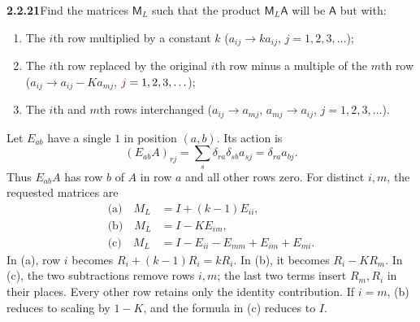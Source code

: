 \par\bigskip
\noindent\textbf{2.2.21}\quad Find the matrices $\mathsf{M}_{L}$ such that the
product $\mathsf{M}_{L}\mathsf{A}$ will be $\mathsf{A}$ but with:
\begin{enumerate}
\item[(a)] The $i$th row multiplied by a constant $k$ ($a_{ij}\to ka_{ij}$,
  $j=1,2,3,\ldots$);
\item[(b)] The $i$th row replaced by the original $i$th row minus a multiple
  of the $m$th row ($a_{ij}\to a_{ij}-Ka_{mj}$, $\erratum{j}=1,2,3,\ldots$);
\item[(c)] The $i$th and $m$th rows interchanged ($a_{ij}\to a_{mj}$,
  $a_{mj}\to a_{ij}$, $j=1,2,3,\ldots$).
\end{enumerate}
\solution
{}
Let $E_{ab}$ have a single $1$ in position $(a,b)$. Its action is
\[
(E_{ab}A)_{rj}=\sum_s\delta_{ra}\delta_{sb}a_{sj}
=\delta_{ra}a_{bj}.
\]
Thus $E_{ab}A$ has row $b$ of $A$ in row $a$ and all other rows
zero. For distinct $i,m$, the requested matrices are
\[
\boxed{\begin{aligned}
\text{(a)}\quad M_L&=I+(k-1)E_{ii},\\
\text{(b)}\quad M_L&=I-KE_{im},\\
\text{(c)}\quad M_L&=I-E_{ii}-E_{mm}+E_{im}+E_{mi}.
\end{aligned}}
\]
In (a), row $i$ becomes $R_i+(k-1)R_i=kR_i$.
In (b), it becomes $R_i-KR_m$.
In (c), the two subtractions remove rows $i,m$; the last two
terms insert $R_m,R_i$ in their places. Every other row retains
only the identity contribution. If $i=m$, (b) reduces to scaling
by $1-K$, and the formula in (c) reduces to $I$.

